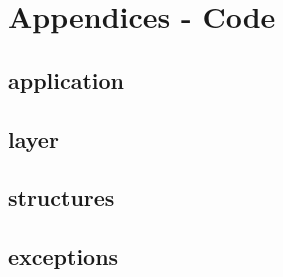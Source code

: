 \documentclass[../../main.tex]{subfiles}
\begin{document}
\part{Appendices - Code}

\chapter{application}


\chapter{layer}


\chapter{structures}


\chapter{exceptions}
\end{document}

